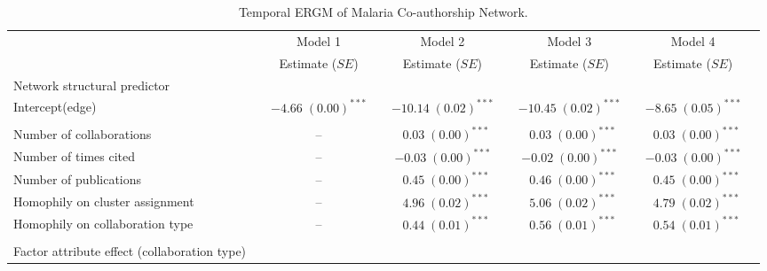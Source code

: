 \begin{table}[!h]
\begin{center}
\caption{Temporal ERGM of Malaria Co-authorship Network.}
\label{tab:malaria_tergm}
\hspace*{-1cm}
\scriptsize
\begin{tabular}{@{}lcclclclcl@{}}
        \toprule
           &  & Model 1 &  & Model 2  &  & Model 3&  & Model 4\\ \cmidrule{3-3} \cmidrule{5-5} \cmidrule{7-7} \cmidrule{9-9}
           &  & Estimate ($SE$) &  & Estimate ($SE$)  &  & Estimate ($SE$) &  & Estimate ($SE$)\\ 
        \midrule
Network structural predictor & & & & & & & & \\
\hspace{10pt}Intercept(edge)   &  & $-4.66 \; (0.00)^{***}$ &  & $-10.14 \; (0.02)^{***}$ &  & $-10.45 \; (0.02)^{***}$ &  & $-8.65 \; (0.05)^{***}$ \\ \\
Number of collaborations          &  & --  &  & $\hspace{6pt}0.03 \; (0.00)^{***}$  &  & $\hspace{6pt}0.03 \; (0.00)^{***}$  &  & $\hspace{6pt}0.03 \; (0.00)^{***}$  \\
Number of times cited   &  & -- &  & $-0.03 \; (0.00)^{***}$ &  & $-0.02 \; (0.00)^{***}$ &  & $-0.03 \; (0.00)^{***}$ \\
Number of publications  &  & --  &  & $\hspace{6pt}0.45 \; (0.00)^{***}$  &  & $\hspace{6pt}0.46 \; (0.00)^{***}$  &  & $\hspace{6pt}0.45 \; (0.00)^{***}$  \\
Homophily on cluster assignment  &  & --  &  & $\hspace{6pt}4.96 \; (0.02)^{***}$  &  & $\hspace{6pt}5.06 \; (0.02)^{***}$  &  & $\hspace{6pt}4.79 \; (0.02)^{***}$  \\
Homophily on collaboration type   &  & --  &  & $\hspace{6pt}0.44 \; (0.01)^{***}$  &  & $\hspace{6pt}0.56 \; (0.01)^{***}$  &  & $\hspace{6pt}0.54 \; (0.01)^{***}$  \\ \\
Factor attribute effect (collaboration type) & & & & & & & & \\

\end{tabular}
\end{center}
\end{table}

